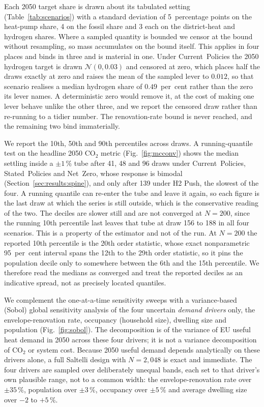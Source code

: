 Each 2050 target share is drawn about its tabulated setting
(Table~\ref{tab:scenarios}) with a standard deviation of 5~percentage points on the
heat-pump share, 4 on the fossil share and 3 each on the district-heat and hydrogen
shares. Where a sampled quantity is bounded we censor at the bound without resampling, so mass accumulates on the bound itself. This applies in four places and binds in three and is material in
one. Under Current~Policies the 2050 hydrogen target is drawn
$\mathcal{N}(0,0.03)$ and censored at zero, which places half the draws exactly at
zero and raises the mean of the sampled lever to $0.012$, so that scenario realises a
median hydrogen share of $0.49$~per~cent rather than the zero its lever names. A
deterministic zero would remove it, at the cost of making one lever behave unlike the
other three, and we report the censored draw rather than re-running to a tidier number.
The renovation-rate bound is never reached, and the
remaining two bind immaterially.

We report the 10th, 50th and 90th percentiles across draws. A running-quantile test on
the headline 2050 CO$_2$ metric (Fig.~\ref{fig:mcconv}) shows the median settling inside
a $\pm1\,\%$ tube
after 41, 48 and 96 draws under Current~Policies, Stated~Policies and Net~Zero, whose
response is bimodal (Section~\ref{sec:results:spine}), and only after 139 under H2 Push,
the slowest of the four. A running quantile can re-enter the tube and leave it again, so
each figure is the last draw at which the series is still outside, which is the
conservative reading of the two.
The deciles are slower still and are not converged at $N=200$, since the running 10th
percentile last leaves that tube at draw 156 to 188 in all four scenarios. This is a property of the estimator and not of the run. At $N=200$ the reported 10th
percentile is the 20th order statistic, whose exact nonparametric 95~per~cent interval
spans the 12th to the 29th order statistic, so it pins the population decile only to
somewhere between the 6th and the 15th percentile. We therefore read the medians as
converged and treat the reported deciles as an indicative spread, not as precisely located quantiles.

We complement the one-at-a-time sensitivity sweeps with a variance-based (Sobol) global
sensitivity analysis of the four uncertain \emph{demand drivers} only, the
envelope-renovation rate, occupancy (household size), dwelling size and population
(Fig.~\ref{fig:sobol}). The decomposition is of the variance of EU useful heat demand in
2050 across these four drivers; it is not a variance decomposition of CO$_2$ or system
cost. Because 2050 useful demand depends analytically on these drivers alone, a full
Saltelli design with $N=2{,}048$ is exact and immediate. The four drivers are sampled
over deliberately unequal bands, each set to that driver's own plausible range, not to
a common width: the envelope-renovation rate over $\pm 35\,\%$, population over $\pm
3\,\%$, occupancy over $\pm 5\,\%$ and average dwelling size over $-2$ to $+5\,\%$.

